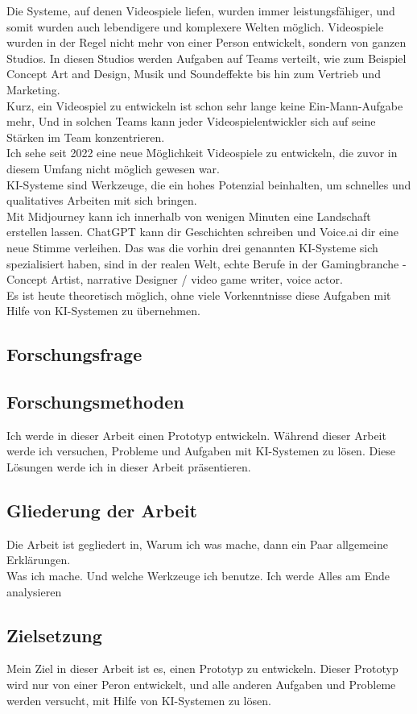 \documentclass[10pt,a4paper,bibliography=totocnumbered,listof=totocnumbered]{scrartcl}
\begin{document}
 
Die Systeme, auf denen Videospiele liefen, wurden immer leistungsfähiger, und somit wurden auch lebendigere und komplexere Welten möglich. Videospiele wurden in der Regel nicht mehr von einer Person entwickelt, sondern von ganzen Studios. In diesen Studios werden Aufgaben auf Teams verteilt, wie zum Beispiel Concept Art and Design, Musik und Soundeffekte bis hin zum Vertrieb und Marketing.
\\
Kurz, ein Videospiel zu entwickeln ist schon sehr lange keine Ein-Mann-Aufgabe mehr, Und in solchen Teams kann jeder Videospielentwickler sich auf seine Stärken im Team konzentrieren.
\\
Ich sehe seit 2022 eine neue Möglichkeit Videospiele zu entwickeln, die zuvor in diesem Umfang nicht möglich gewesen war.
\\
KI-Systeme sind Werkzeuge, die ein hohes Potenzial beinhalten, um schnelles und qualitatives Arbeiten mit sich bringen.
\\
Mit Midjourney kann ich innerhalb von wenigen Minuten eine Landschaft erstellen lassen. ChatGPT kann dir Geschichten schreiben und Voice.ai dir eine neue Stimme verleihen. Das was die vorhin drei genannten KI-Systeme sich spezialisiert haben, sind in der realen
Welt, echte Berufe in der Gamingbranche - Concept Artist, narrative Designer / video game writer, voice actor.
\\
Es ist heute theoretisch möglich, ohne viele Vorkenntnisse diese Aufgaben mit Hilfe von KI-Systemen zu übernehmen.
\subsection{Forschungsfrage}

\subsection{Forschungsmethoden}
Ich werde in dieser Arbeit einen Prototyp entwickeln. Während dieser Arbeit werde ich versuchen, Probleme und Aufgaben mit KI-Systemen zu lösen. Diese Lösungen werde ich in dieser Arbeit präsentieren.
\subsection{Gliederung der Arbeit}%
Die Arbeit ist gegliedert in, Warum ich was mache, dann ein Paar allgemeine Erklärungen.
\\
Was ich mache. Und welche Werkzeuge ich benutze. Ich werde Alles am Ende analysieren
\subsection{Zielsetzung}
Mein Ziel in dieser Arbeit ist es, einen Prototyp zu entwickeln. Dieser Prototyp wird nur von einer Peron entwickelt, und alle anderen Aufgaben und Probleme werden versucht, mit Hilfe von KI-Systemen zu lösen.
\end{document}

